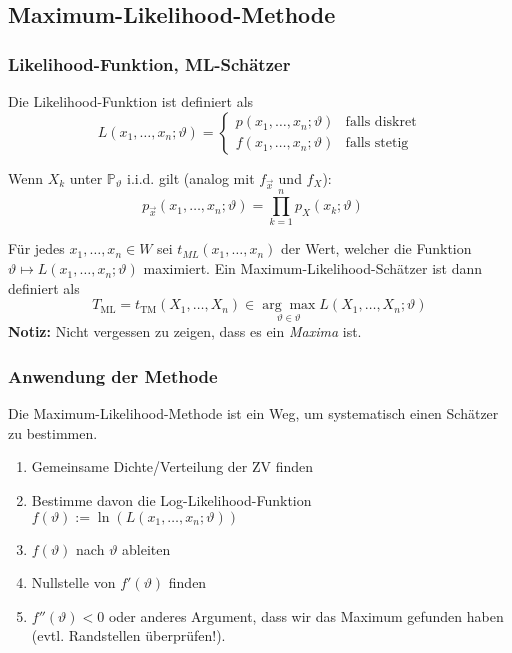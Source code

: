 \subsection{Maximum-Likelihood-Methode}
\subsubsection{Likelihood-Funktion, ML-Schätzer}
Die Likelihood-Funktion ist definiert als
\[L(x_1, \ldots, x_n; \vartheta) = \begin{cases}
		p(x_1, \ldots, x_n; \vartheta) & \text{falls diskret} \\
		f(x_1, \ldots, x_n; \vartheta) & \text{falls stetig}
	\end{cases} \]
	
Wenn $X_{k}$ unter $\mathbb{P}_{\vartheta}$ i.i.d. gilt (analog mit $f_{\vec{x}}$ und $f_X$):
$$
p_{\vec{x}}\left(x_{1}, \ldots, x_{n} ; \vartheta\right)=\prod_{k=1}^{n} p_{X}\left(x_{k} ; \vartheta\right)\quad 
$$

\noindent Für jedes \(x_1, \ldots, x_n \in W\) sei \(t_{ML}(x_1, \ldots, x_n)\) der Wert, welcher die Funktion \(\vartheta \mapsto L(x_1, \ldots, x_n; \vartheta)\) maximiert. Ein Maximum-Likelihood-Schätzer ist dann definiert als
\[T_{\mathrm{ML}}=t_{\mathrm{TM}}\left(X_{1}, \ldots, X_{n}\right) \in \underset{\vartheta \in \vartheta}{\arg \max } L\left(X_{1}, \ldots, X_{n} ; \vartheta\right)\]
\textbf{Notiz:} Nicht vergessen zu zeigen, dass es ein \textit{Maxima} ist.

\subsubsection{Anwendung der Methode}
Die Maximum-Likelihood-Methode ist ein Weg, um systematisch einen Schätzer zu bestimmen.
\begin{enumerate}
	\item Gemeinsame Dichte/Verteilung der ZV finden
	\item Bestimme davon die Log-Likelihood-Funktion\\ \(f(\vartheta) := \ln(L(x_1, \ldots, x_n;\vartheta))\)
	\item \(f(\vartheta)\) nach \(\vartheta\) ableiten
	\item Nullstelle von \(f'(\vartheta)\) finden
	\item $f''(\vartheta) < 0$ oder anderes Argument, dass wir das Maximum gefunden haben (evtl. Randstellen überprüfen!).
\end{enumerate}


